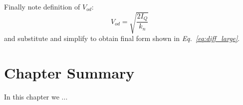 Finally note definition of $V_{od}$:
    \begin{equation}
        V_{od} = \sqrt{\frac{2 I_Q}{k_n}}
    \end{equation}
and substitute and simplify to obtain final form shown in \emph{Eq.~\ref{eq:diff_large}}.
\newpage
\section{Chapter Summary}
In this chapter we ...
